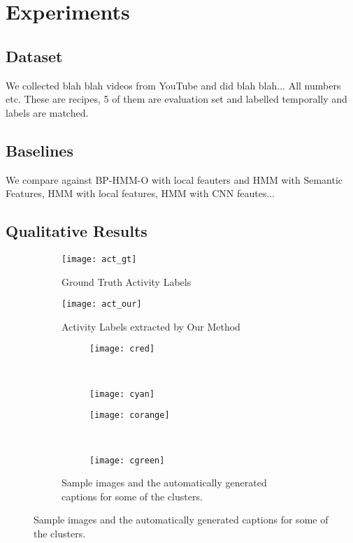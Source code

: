 \section{Experiments}
\subsection{Dataset}
We collected blah blah videos from YouTube and did blah blah... All numbers etc. These are recipes, 5 of them are evaluation set and labelled temporally and labels are matched.
\subsection{Baselines}
We compare against BP-HMM-O with local feauters and HMM with Semantic Features, HMM with local features, HMM with CNN feautes...
\subsection{Qualitative Results}
\begin{figure}
  \begin{subfigure}[b]{0.5\textwidth}
  \texttt{[image: act\_gt]}
  \caption{Ground Truth Activity Labels}
  \end{subfigure}
  \begin{subfigure}[b]{0.5\textwidth}
  \texttt{[image: act\_our]}
  \caption{Activity Labels extracted by Our Method}
  \end{subfigure}

\begin{subfigure}[b]{0.5\textwidth}
\begin{subfigure}[b]{0.5\textwidth}
\texttt{[image: cred]}
\color[HTML]{FF3800}{Crack the eggs one at a time into a bowl.}
\end{subfigure}~
\begin{subfigure}[b]{0.5\textwidth}
\texttt{[image: cyan]}
\color[HTML]{00FFED}{Remove the omelette onto a plate.}
\end{subfigure}


\begin{subfigure}[b]{0.5\textwidth}
\texttt{[image: corange]}
\color[HTML]{FF9900}{You can either use a fork or wire whisk to beat the eggs into a bowl.}
\end{subfigure}~
\begin{subfigure}[b]{0.5\textwidth}
\texttt{[image: cgreen]}
\color[HTML]{9DFF00}{Eggs cook quickly, so make sure the pan gets very hot first; the butter melt completely.}
\end{subfigure}



\caption{Sample images and the automatically generated captions for some of the clusters.}
\end{subfigure}

\end{figure}

